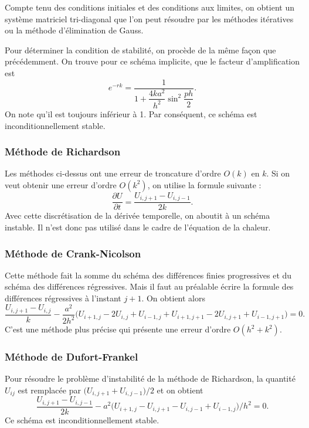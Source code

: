 Compte tenu des conditions initiales et des conditions aux limites, on obtient
un système matriciel tri-diagonal que l'on peut résoudre par les méthodes
itératives ou la méthode d'élimination de Gauss.

Pour déterminer la condition de stabilité, on procède de la même façon que
précédemment. On trouve pour ce schéma implicite, que le facteur
d'amplification est
\[
  e^{-rk} = \frac{1}{1 + \dfrac{4ka^2}{h^2}\sin^2\dfrac{ph}{2}} .
\]
On note qu'il est toujours inférieur à 1. Par conséquent, ce schéma est
inconditionnellement stable.

\subsubsection{Méthode de Richardson}

Les méthodes ci-dessus ont une erreur de troncature d'ordre $O(k)$ en $k$. Si
on veut obtenir une erreur d'ordre $O(k^2)$, on utilise la formule suivante :
\begin{equation}
  \frac{\partial U}{\partial t} = \frac{U_{i,j+1} - U_{i,j-1}}{2k} .
  \tag{C6}
\end{equation}
Avec cette discrétisation de la dérivée temporelle, on aboutit à un schéma
instable. Il n'est donc pas utilisé dans le cadre de l'équation de la
chaleur.

\subsubsection{Méthode de Crank-Nicolson}

Cette méthode fait la somme du schéma des différences finies progressives et
du schéma des différences régressives. Mais il faut au préalable écrire la
formule des différences régressives à l'instant $j+1$. On obtient alors
\[
  \frac{U_{i,j+1} - U_{i,j}}{k}
  - \frac{a^2}{2h^2}\bigl(U_{i+1,j} - 2U_{i,j} + U_{i-1,j}
                         + U_{i+1,j+1} - 2U_{i,j+1} + U_{i-1,j+1}\bigr) = 0 .
\]
C'est une méthode plus précise qui présente une erreur d'ordre
$O(h^2 + k^2)$.

\subsubsection{Méthode de Dufort-Frankel}

Pour résoudre le problème d'instabilité de la méthode de Richardson, la
quantité $U_{ij}$ est remplacée par $\bigl(U_{i,j+1} + U_{i,j-1}\bigr)/2$ et
on obtient
\[
  \frac{U_{i,j+1} - U_{i,j-1}}{2k}
  - a^2\bigl(U_{i+1,j} - U_{i,j+1} - U_{i,j-1} + U_{i-1,j}\bigr)/h^2 = 0 .
\]
Ce schéma est inconditionnellement stable.

